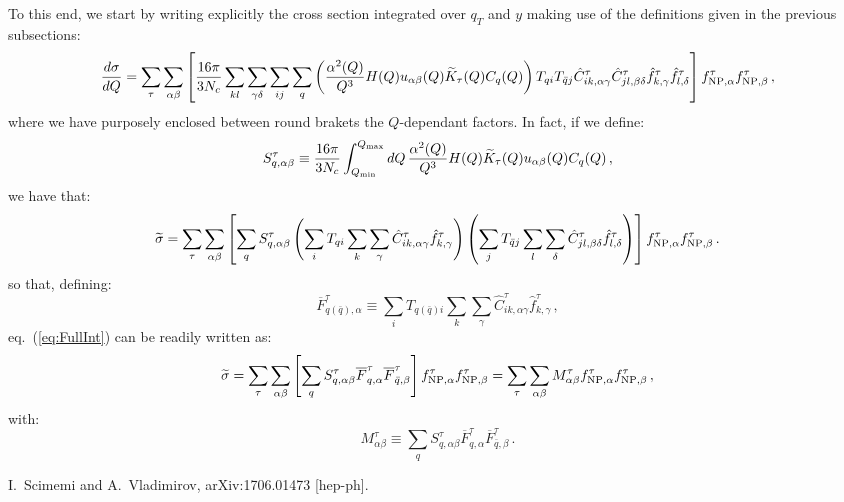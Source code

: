 \documentclass[10pt,a4paper]{article}
\begin{document}
To this end, we start by writing explicitly the cross section
integrated over $q_T$ and $y$ making use of the definitions given in
the previous subsections:
\begin{equation}
  \frac{d\sigma}{dQ} =\sum_\tau \sum_{\alpha\beta}\left[\frac{16\pi}{3N_c}\sum_{kl} \sum_{\gamma\delta}\sum_{ij}\sum_q
    \left(\frac{\alpha^2(Q)}{Q^3} H(Q) u_{\alpha\beta}(Q)
    \widetilde{K}_\tau(Q) C_q(Q)\right)
    T_{qi}T_{\bar{q}j}
    \hat{C}_{ik,\alpha\gamma}^\tau \hat{C}_{jl,\beta\delta}^\tau 
  \hat{f}_{k,\gamma}^{\tau}
  \hat{f}_{l,\delta}^{\tau}\right]f_{{\rm NP},\alpha}^\tau f_{{\rm NP},\beta}^\tau\,,
\end{equation}
where we have purposely enclosed between round brakets the
$Q$-dependant factors. In fact, if we define:
\begin{equation}
S_{q,\alpha\beta}^{\tau}\equiv \frac{16\pi}{3N_c}\int_{Q_{\rm min}}^{Q_{\rm max}}dQ\,
    \frac{\alpha^2(Q)}{Q^3} H(Q) \widetilde{K}_\tau(Q) u_{\alpha\beta}(Q)
    C_q(Q)\,,
\end{equation}
we have that:
\begin{equation}\label{eq:FullInt}
  \widetilde{\sigma} =\sum_\tau \sum_{\alpha\beta}\left[ \sum_q
    S_{q,\alpha\beta}^{\tau} \left(\sum_{i}
    T_{qi}\sum_{k} \sum_{\gamma}
    \hat{C}_{ik,\alpha\gamma}^\tau 
  \hat{f}_{k,\gamma}^{\tau}\right)
\left(\sum_{j}
    T_{\bar{q}j}\sum_{l} \sum_{\delta}
    \hat{C}_{jl,\beta\delta}^\tau 
  \hat{f}_{l,\delta}^{\tau}\right)
\right]f_{{\rm NP},\alpha}^\tau f_{{\rm NP},\beta}^\tau\,.
\end{equation}
so that, defining:
\begin{equation}
  \overline{F}_{q(\bar{q}),\alpha}^\tau \equiv \sum_{i}
  T_{q(\bar{q})i}\sum_{k} \sum_{\gamma}
  \hat{C}_{ik,\alpha\gamma}^\tau 
  \hat{f}_{k,\gamma}^{\tau}\,,
\end{equation}
eq.~(\ref{eq:FullInt}) can be readily written as:
\begin{equation}
  \widetilde{\sigma} =\sum_\tau \sum_{\alpha\beta}\left[ \sum_q
    S_{q,\alpha\beta}^{\tau}\overline{F}_{q,\alpha}^\tau
    \overline{F}_{\bar{q},\beta}^\tau \right]f_{{\rm NP},\alpha}^\tau
  f_{{\rm NP},\beta}^\tau=\sum_\tau
  \sum_{\alpha\beta}M_{\alpha\beta}^\tau f_{{\rm NP},\alpha}^\tau f_{{\rm NP},\beta}^\tau\,,
\end{equation}
with:
\begin{equation}
M_{\alpha\beta}^\tau\equiv \sum_q S_{q,\alpha\beta}^{\tau}\overline{F}_{q,\alpha}^\tau
\overline{F}_{\bar{q},\beta}^\tau\,.
\end{equation}



\begin{thebibliography}{alp}

  I.~Scimemi and A.~Vladimirov,
  arXiv:1706.01473 [hep-ph].

\end{thebibliography}
\end{document}

